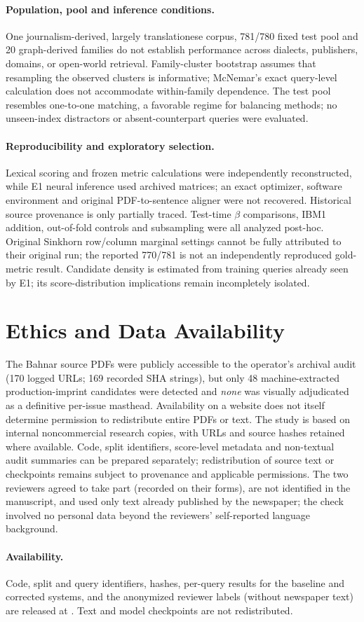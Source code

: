 \paragraph{Population, pool and inference conditions.} One journalism-derived, largely translationese corpus, 781/780 fixed test pool and 20 graph-derived families do not establish performance across dialects, publishers, domains, or open-world retrieval. Family-cluster bootstrap assumes that resampling the observed clusters is informative; McNemar's exact query-level calculation does not accommodate within-family dependence. The test pool resembles one-to-one matching, a favorable regime for balancing methods; no unseen-index distractors or absent-counterpart queries were evaluated.

\paragraph{Reproducibility and exploratory selection.} Lexical scoring and frozen metric calculations were independently reconstructed, while E1 neural inference used archived matrices; an exact optimizer, software environment and original PDF-to-sentence aligner were not recovered. Historical source provenance is only partially traced. Test-time $\beta$ comparisons, IBM1 addition, out-of-fold controls and subsampling were all analyzed post-hoc. Original Sinkhorn row/column marginal settings cannot be fully attributed to their original run; the reported 770/781 is not an independently reproduced gold-metric result. Candidate density is estimated from training queries already seen by E1; its score-distribution implications remain incompletely isolated.

\section{Ethics and Data Availability}
The Bahnar source PDFs were publicly accessible to the operator's archival audit (170 logged URLs; 169 recorded SHA strings), but only 48 machine-extracted production-imprint candidates were detected and \emph{none} was visually adjudicated as a definitive per-issue masthead. Availability on a website does not itself determine permission to redistribute entire PDFs or text. The study is based on internal noncommercial research copies, with URLs and source hashes retained where available. Code, split identifiers, score-level metadata and non-textual audit summaries can be prepared separately; redistribution of source text or checkpoints remains subject to provenance and applicable permissions. The two reviewers agreed to take part (recorded on their forms), are not identified in the manuscript, and used only text already published by the newspaper; the check involved no personal data beyond the reviewers' self-reported language background.

\paragraph{Availability.} Code, split and query identifiers, hashes, per-query results for the baseline and corrected systems, and the anonymized reviewer labels (without newspaper text) are released at \repourl. Text and model checkpoints are not redistributed.
